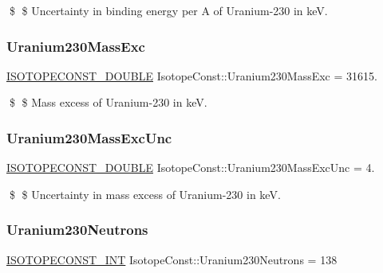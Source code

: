\$ \$ Uncertainty in binding energy per A of Uranium-\/230 in keV. \mbox{\label{group___isotope_const-_uranium-_u230_gac11b4362f255939765c94887322bcbe8}} 
\subsubsection{\texorpdfstring{Uranium230\+Mass\+Exc}{Uranium230MassExc}}
{\footnotesize\ttfamily \mbox{\hyperlink{group___isotope_const-_macros_ga8f45a7272ce02c0b4c65c44636ed719a}{I\+S\+O\+T\+O\+P\+E\+C\+O\+N\+S\+T\+\_\+\+D\+O\+U\+B\+LE}} Isotope\+Const\+::\+Uranium230\+Mass\+Exc = 31615.}

\$ \$ Mass excess of Uranium-\/230 in keV. \mbox{\label{group___isotope_const-_uranium-_u230_gad090b31c8222ba57b41c0cf15005450e}} 
\subsubsection{\texorpdfstring{Uranium230\+Mass\+Exc\+Unc}{Uranium230MassExcUnc}}
{\footnotesize\ttfamily \mbox{\hyperlink{group___isotope_const-_macros_ga8f45a7272ce02c0b4c65c44636ed719a}{I\+S\+O\+T\+O\+P\+E\+C\+O\+N\+S\+T\+\_\+\+D\+O\+U\+B\+LE}} Isotope\+Const\+::\+Uranium230\+Mass\+Exc\+Unc = 4.}

\$ \$ Uncertainty in mass excess of Uranium-\/230 in keV. \mbox{\label{group___isotope_const-_uranium-_u230_ga43ed6f1a67e44dfe89bb88da084cf20e}} 
\subsubsection{\texorpdfstring{Uranium230\+Neutrons}{Uranium230Neutrons}}
{\footnotesize\ttfamily \mbox{\hyperlink{group___isotope_const-_macros_ga5f18360b3e99483a35c32d789e62621c}{I\+S\+O\+T\+O\+P\+E\+C\+O\+N\+S\+T\+\_\+\+I\+NT}} Isotope\+Const\+::\+Uranium230\+Neutrons = 138}

